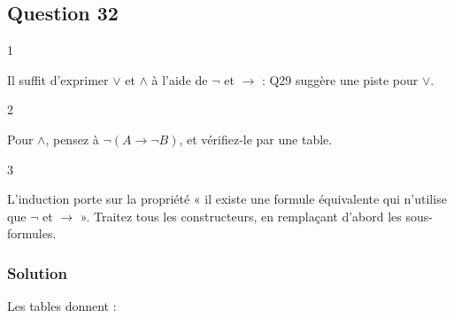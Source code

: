 \documentclass[11pt,a4paper]{article}
\begin{document}
\hypertarget{question-32}{%
\subsection{Question 32}\label{question-32}}

\begin{indication}{1}

Il suffit d'exprimer \(\vee\) et \(\wedge\) à l'aide de \(\neg\) et \(\to\) : Q29 suggère une piste pour \(\vee\).

\end{indication}

\begin{indication}{2}

Pour \(\wedge\), pensez à \(\neg(A \to \neg B)\), et vérifiez-le par une table.

\end{indication}

\begin{indication}{3}

L'induction porte sur la propriété « il existe une formule équivalente qui n'utilise que \(\neg\) et \(\to\) ». Traitez tous les constructeurs, en remplaçant d'abord les sous-formules.

\end{indication}

\hypertarget{solution-31}{%
\subsubsection{Solution}\label{solution-31}}

Les tables donnent :
\end{document}
